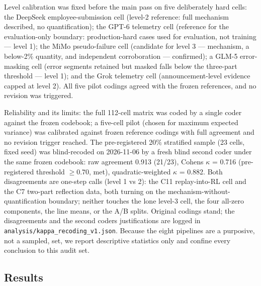 \documentclass[10pt]{article}
\begin{document}
Level calibration was fixed before the main pass on five deliberately hard cells: the DeepSeek employee-submission cell (level-2 reference: full mechanism described, no quantification); the GPT-6 telemetry cell (reference for the evaluation-only boundary: production-hard cases used for evaluation, not training --- level 1); the MiMo pseudo-failure cell (candidate for level 3 --- mechanism, a below-2\% quantity, and independent corroboration --- confirmed); a GLM-5 error-masking cell (error segments retained but masked falls below the three-part threshold --- level 1); and the Grok telemetry cell (announcement-level evidence capped at level 2). All five pilot codings agreed with the frozen references, and no revision was triggered.

Reliability and its limits: the full 112-cell matrix was coded by a single coder against the frozen codebook; a five-cell pilot (chosen for maximum expected variance) was calibrated against frozen reference codings with full agreement and no revision trigger reached. The pre-registered 20\% stratified sample (23 cells, fixed seed) was blind-recoded on 2026-11-06 by a fresh blind second coder under the same frozen codebook: raw agreement 0.913 (21/23), Cohen\textquotesingle{}s $\kappa$ = 0.716 (pre-registered threshold $\ge 0.70$, met), quadratic-weighted $\kappa$ = 0.882. Both disagreements are one-step calls (level 1 vs 2): the C11 replay-into-RL cell and the C7 two-part reflection data, both turning on the mechanism-without-quantification boundary; neither touches the lone level-3 cell, the four all-zero components, the line means, or the A/B splits. Original codings stand; the disagreements and the second coder\textquotesingle{}s justifications are logged in \texttt{analysis/kappa\_recoding\_v1.json}. Because the eight pipelines are a purposive, not a sampled, set, we report descriptive statistics only and confine every conclusion to this audit set.



\subsection{Results}
\end{document}
